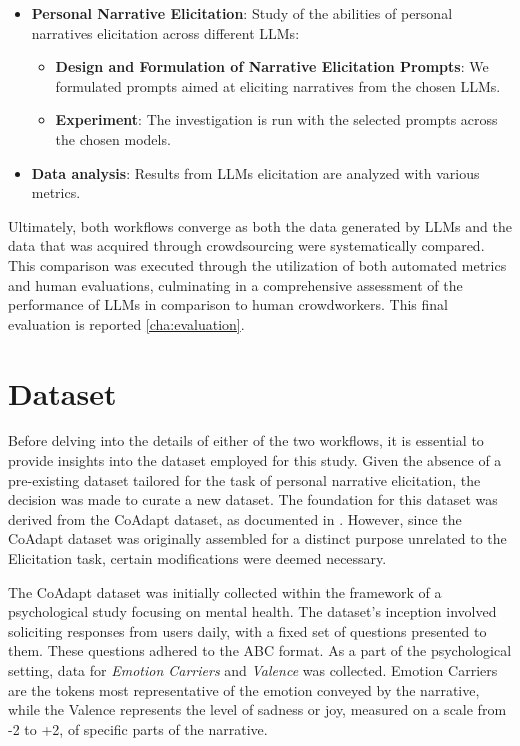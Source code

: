 \begin{itemize}
\begin{itemize}
\begin{itemize}
            \end{itemize}
            \item \textbf{Personal Narrative Elicitation}: Study of the abilities of personal narratives elicitation across different LLMs:
            \begin{itemize}
                \item \textbf{Design and Formulation of Narrative Elicitation Prompts}: We formulated prompts aimed at eliciting narratives from the chosen LLMs.
                \item \textbf{Experiment}: The investigation is run with the selected prompts across the chosen models.
            \end{itemize}
            \item \textbf{Data analysis}: Results from LLMs elicitation are analyzed with various metrics.
        \end{itemize}
\end{itemize}
Ultimately, both workflows converge as both the data generated by LLMs and the data that was acquired through crowdsourcing were systematically compared. This comparison was executed through the utilization of both automated metrics and human evaluations, culminating in a comprehensive assessment of the performance of LLMs in comparison to human crowdworkers. This final evaluation is reported \ref{cha:evaluation}.
\section{Dataset}
Before delving into the details of either of the two workflows, it is essential to provide insights into the dataset employed for this study. Given the absence of a pre-existing dataset tailored for the task of personal narrative elicitation, the decision was made to curate a new dataset. The foundation for this dataset was derived from the CoAdapt dataset, as documented in \cite{coadapt}. However, since the CoAdapt dataset was originally assembled for a distinct purpose unrelated to the Elicitation task, certain modifications were deemed necessary.

The CoAdapt dataset was initially collected within the framework of a psychological study focusing on mental health. The dataset's inception involved soliciting responses from users daily, with a fixed set of questions presented to them. These questions adhered to the ABC format. As a part of the psychological setting, data for \emph{Emotion Carriers} and \emph{Valence} was collected. Emotion Carriers are the tokens most representative of the emotion conveyed by the narrative, while the Valence represents the level of sadness or joy, measured on a scale from -2 to +2, of specific parts of the narrative. 

